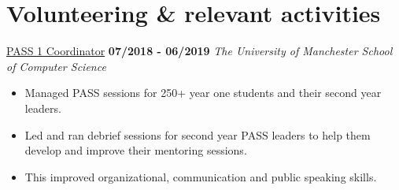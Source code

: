 \documentclass[]{friggeri-cv}
\begin{document}
\section{\color{red}Volunteering \color{gray} \& relevant activities}
\entry
    {}
    {\href{http://www.pass.manchester.ac.uk/}{PASS 1 Coordinator}}
    {\textbf{07/2018 - 06/2019}}
    {\emph{The University of Manchester School of Computer Science}}
    \begin{itemize}
        \item Managed PASS sessions for 250+ year one students and their second year leaders.
        \item Led and ran debrief sessions for second year PASS leaders to help them develop and improve their mentoring sessions.
        \item This improved organizational, communication and public speaking skills.\\
    \end{itemize}
\end{document}
